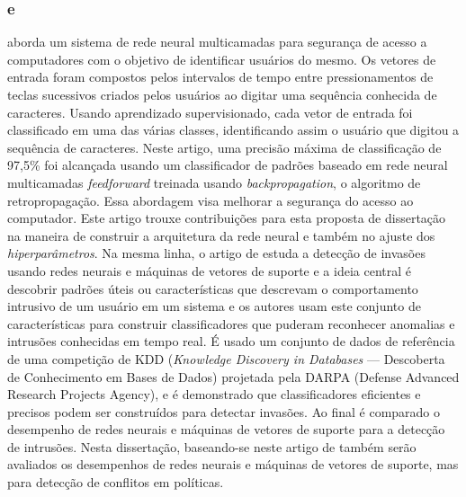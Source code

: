 \subsubsection{ e }
 aborda um sistema de rede neural multicamadas para segurança de acesso a computadores com o objetivo de identificar usuários do mesmo. Os vetores de entrada foram compostos pelos intervalos de tempo entre pressionamentos de teclas sucessivos criados pelos usuários ao digitar uma sequência conhecida de caracteres. Usando aprendizado supervisionado, cada vetor de entrada foi classificado em uma das várias classes, identificando assim o usuário que digitou a sequência de caracteres. Neste artigo, uma precisão máxima de classificação de 97,5\% foi alcançada usando um classificador de padrões baseado em rede neural multicamadas \textit{feedforward} treinada usando \textit{backpropagation}, o algoritmo de retropropagação. Essa abordagem visa melhorar a segurança do acesso ao computador. Este artigo trouxe contribuições para esta proposta de dissertação na maneira de construir a arquitetura da rede neural e também no ajuste dos \textit{hiperparâmetros}. Na mesma linha, o artigo de  estuda a detecção de invasões usando redes neurais e máquinas de vetores de suporte e a ideia central é descobrir padrões úteis ou características que descrevam o comportamento intrusivo de um usuário em um sistema e os autores usam este conjunto de características para construir classificadores que puderam reconhecer anomalias e intrusões conhecidas em tempo real. É usado um conjunto de dados de referência de uma competição de KDD (\textit{Knowledge Discovery in Databases} --- Descoberta de Conhecimento em Bases de Dados) projetada pela DARPA (Defense Advanced Research Projects Agency), e é demonstrado que classificadores eficientes e precisos podem ser construídos para detectar invasões. Ao final é comparado o desempenho de redes neurais e máquinas de vetores de suporte para a detecção de intrusões. Nesta dissertação, baseando-se neste artigo de  também serão avaliados os desempenhos de redes neurais e máquinas de vetores de suporte, mas para detecção de conflitos em políticas.

